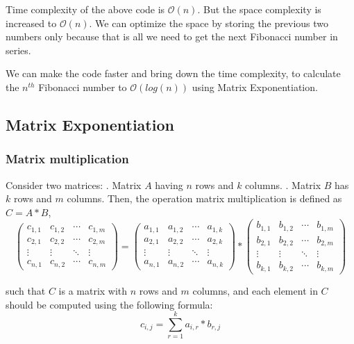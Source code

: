 \documentclass{article}
\begin{document}
Time complexity of the above code is $\mathcal{O}(n)$. But the space complexity is increased to $\mathcal{O}(n)$. We can optimize the space by storing the previous two numbers only because that is all we need to get the next Fibonacci number in series. 

We can make the code faster and bring down the time complexity, to calculate the $n^{th}$ Fibonacci number to $\mathcal{O}(log(n))$ using Matrix Exponentiation.

\subsection{Matrix Exponentiation}
\subsubsection{Matrix multiplication}
Consider two matrices:
. Matrix $A$ having $n$ rows and $k$ columns.
. Matrix $B$ has $k$ rows and $m$ columns.
\newline
Then, the operation matrix multiplication is defined as $C = A * B$, 
$$
\begin{pmatrix}
  c_{1,1} & c_{1,2} & \cdots & c_{1,m} \\
  c_{2,1} & c_{2,2} & \cdots & c_{2,m} \\
  \vdots  & \vdots  & \ddots & \vdots  \\
  c_{n,1} & c_{n,2} & \cdots & c_{n,m} 
 \end{pmatrix}
 =
 \begin{pmatrix}
  a_{1,1} & a_{1,2} & \cdots & a_{1,k} \\
  a_{2,1} & a_{2,2} & \cdots & a_{2,k} \\
  \vdots  & \vdots  & \ddots & \vdots  \\
  a_{n,1} & a_{n,2} & \cdots & a_{n,k}
 \end{pmatrix}
 *
 \begin{pmatrix}
  b_{1,1} & b_{1,2} & \cdots & b_{1,m} \\
  b_{2,1} & b_{2,2} & \cdots & b_{2,m} \\
  \vdots  & \vdots  & \ddots & \vdots  \\
  b_{k,1} & b_{k,2} & \cdots & b_{k,m}
 \end{pmatrix}
$$

such that $C$ is a matrix with $n$ rows and $m$ columns, and each element in $C$ should be computed using the following formula:
$$
c_{i,j} = \sum_{r=1}^{k} a_{i,r} * b_{r, j}
$$
\end{document}
